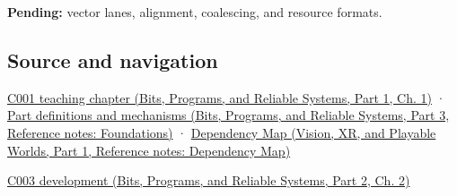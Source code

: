 \textbf{Pending:} vector lanes, alignment, coalescing, and resource formats.

\subsection{Source and navigation}\label{appendix-3c7b1a56de01-source-and-navigation}

\hypertarget{appendix-3c7b1a56de01-source-and-navigation}{}

\href{../01-Bits-Programs-and-Reliable-Systems-P01/main.pdf\#nameddest=01-foundations-i-ch001-from-a-signal-to-an-interpretation}{C001 teaching chapter (Bits, Programs, and Reliable Systems, Part 1, Ch. 1)} · \href{../01-Bits-Programs-and-Reliable-Systems-P03/main.pdf\#nameddest=appendix-fd090d982a15}{Part definitions and mechanisms (Bits, Programs, and Reliable Systems, Part 3, Reference notes: Foundations)} · \href{../07-Vision-XR-and-Playable-Worlds-P01/main.pdf\#nameddest=appendix-4ad47bdd269a}{Dependency Map (Vision, XR, and Playable Worlds, Part 1, Reference notes: Dependency Map)}

\href{../01-Bits-Programs-and-Reliable-Systems-P02/main.pdf\#nameddest=01-foundations-i-ch002-where-the-bytes-live}{C003 development (Bits, Programs, and Reliable Systems, Part 2, Ch. 2)}
